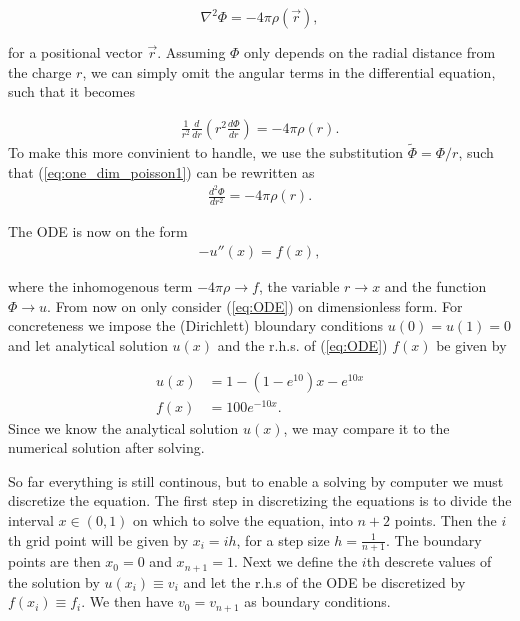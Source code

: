 \documentclass[twocolumn]{aastex62}
\begin{document}
\begin{equation}
	\nabla^2\Phi = -4\pi\rho(\vec{r}),
\end{equation}

for a positional vector $\vec{r}$. Assuming $\Phi$ only depends on the radial distance from the charge $r$, we can simply omit the angular terms in the differential equation, such that it becomes
 
\begin{align}
	\frac{1}{r^2}\frac{d}{dr}\left(r^2\frac{d\Phi}{dr}\right) = -4\pi\rho(r).
\label{eq:one_dim_poisson1}	
\end{align}
To make this more convinient to handle, we use the substitution $\tilde{\Phi} = \Phi/r$, such that (\ref{eq:one_dim_poisson1}) can be rewritten as 
\begin{align}
	\frac{d^2\Phi}{dr^2} = -4\pi\rho(r).
\end{align}

The ODE is now on the form 
\begin{align}
	-u''(x) = f(x),
	\label{eq:ODE}
\end{align}

where the inhomogenous term $-4\pi\rho\to f$, the variable $r\to x$ and the function $\Phi\to u$. From now on only consider (\ref{eq:ODE}) on dimensionless form. For concreteness we impose the (Dirichlett) bloundary conditions $u(0) = u(1) = 0$ and let analytical solution $u(x)$ and the r.h.s. of (\ref{eq:ODE}) $f(x)$ be given by

\begin{align}
	u(x) &= 1 - (1 - e^{10})x - e^{10x}\label{eq:analytical}\\
	f(x) &= 100e^{-10x}.
\end{align}
Since we know the analytical solution $u(x)$, we may compare it to the numerical solution after solving.

So far everything is still continous, but to enable a solving by computer we must discretize the equation. The first step in discretizing the equations is to divide the interval $x\in(0,1)$ on which to solve the equation, into $n+2$ points. Then the $i$th grid point will be given by $x_i = ih$, for a step size $h = \frac{1}{n + 1}$. The boundary points are then $x_0 = 0$ and $x_{n+1} = 1$. Next we define the $i$th descrete values of the solution by $u(x_i) \equiv v_i$ and let the r.h.s of the ODE be discretized by $f(x_i) \equiv f_i$. We then have $v_0 = v_{n+1}$ as boundary conditions.
\end{document}
